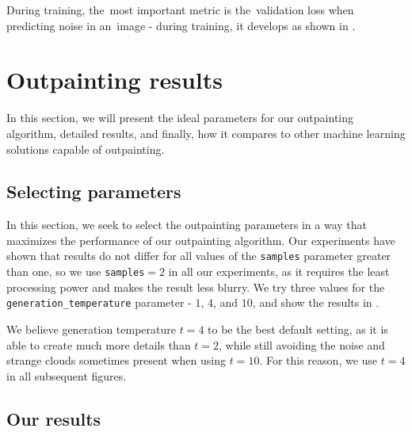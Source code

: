During training, the~most important metric is the~validation loss when predicting noise in an~image - during training, it develops as shown in .



\FloatBarrier

\section{Outpainting results}

In this section, we will present the ideal parameters for our outpainting algorithm, detailed results, and finally, how it compares to other machine learning solutions capable of outpainting.

\subsection{Selecting parameters}

In this section, we seek to select the outpainting parameters in a way that maximizes the performance of our outpainting algorithm. Our experiments have shown that results do not differ for all values of the \texttt{samples} parameter greater than one, so we use \texttt{samples}$=2$ in all our experiments, as it requires the least processing power and makes the result less blurry. We try three values for the \texttt{generation\_temperature} parameter - $1$, $4$, and $10$, and show the results in .


We believe generation temperature $t=4$ to be the best default setting, as it is able to create much more details than $t=2$, while still avoiding the noise and strange clouds sometimes present when using $t=10$. For this reason, we use $t=4$ in all subsequent figures.


\subsection{Our results}

